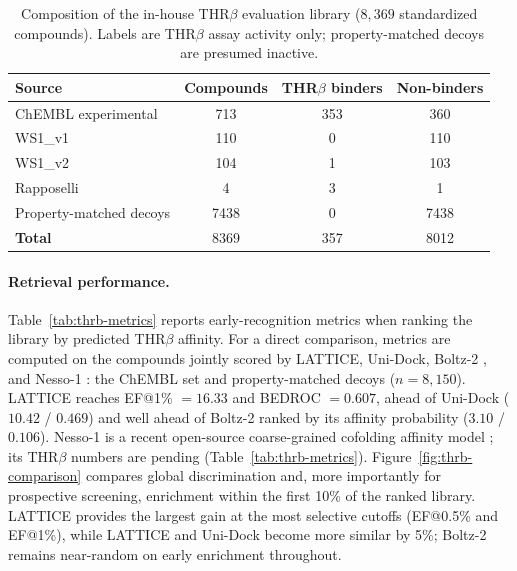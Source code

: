 \documentclass[10pt]{article}
\begin{document}
\begin{table}[h]\centering
  \caption{Composition of the in-house THR$\beta$ evaluation library
  ($8{,}369$ standardized compounds). Labels are THR$\beta$ assay activity only;
  property-matched decoys are presumed inactive.}
  \label{tab:thrb-dataset}\small\setlength{\tabcolsep}{7pt}
  \begin{tabular}{l S[table-format=4.0] S[table-format=3.0] S[table-format=4.0]}
    \toprule
    Source & {Compounds} & {THR$\beta$ binders} & {Non-binders} \\
    \midrule
    ChEMBL experimental     & 713  & 353 & 360  \\
    WS1\_v1                  & 110  & 0   & 110  \\
    WS1\_v2                  & 104  & 1   & 103  \\
    Rapposelli              & 4    & 3   & 1    \\
    Property-matched decoys & 7438 & 0   & 7438 \\
    \midrule
    \textbf{Total}          & 8369 & 357 & 8012 \\
    \bottomrule
  \end{tabular}
\end{table}

\paragraph{Retrieval performance.}
Table~\ref{tab:thrb-metrics} reports early-recognition metrics when ranking the
library by predicted THR$\beta$ affinity. For a direct comparison, metrics are
computed on the compounds jointly scored by LATTICE, Uni-Dock, Boltz-2
\citep{passaro2025boltz2}, and Nesso-1 \citep{valencelabs2026nesso1}: the
ChEMBL set and property-matched decoys ($n{=}8{,}150$). LATTICE reaches
EF@1\% $=16.33$ and BEDROC $=0.607$, ahead of Uni-Dock ($10.42$ / $0.469$) and
well ahead of Boltz-2 ranked by its affinity probability ($3.10$ / $0.106$).
Nesso-1 is a recent open-source coarse-grained cofolding affinity model
\citep{valencelabs2026nesso1}; its THR$\beta$ numbers are pending (Table~\ref{tab:thrb-metrics}).
Figure~\ref{fig:thrb-comparison} compares global discrimination and, more
importantly for prospective screening, enrichment within the first 10\% of the
ranked library. LATTICE provides the largest gain at the most selective cutoffs
(EF@0.5\% and EF@1\%), while LATTICE and Uni-Dock become more similar by 5\%;
Boltz-2 remains near-random on early enrichment throughout.
\end{document}

